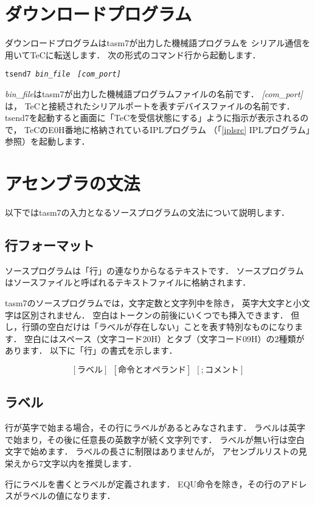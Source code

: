\section{ダウンロードプログラム}
ダウンロードプログラムはtasm7が出力した機械語プログラムを
シリアル通信を用いてTeCに転送します．
次の形式のコマンド行から起動します．

\begin{center}
{\small\tt tsend7  {\it bin\_file}　{\it [com\_port]}} \\
\end{center}

{\it bin\_file}はtasm7が出力した機械語プログラムファイルの名前です．
{\it [com\_port]}は，
TeCと接続されたシリアルポートを表すデバイスファイルの名前です．
tsend7を起動すると画面に「TeCを受信状態にする」ように指示が表示されるので，
TeCのE0H番地に格納されているIPLプログラム
（「\ref{iplsrc} IPLプログラム」参照）を起動します．

\section{アセンブラの文法}
\label{syn}
以下ではtasm7の入力となるソースプログラムの文法について説明します．

\subsection{行フォーマット}
ソースプログラムは「行」の連なりからなるテキストです．
ソースプログラムはソースファイルと呼ばれるテキストファイルに格納されます．

tasm7のソースプログラムでは，文字定数と文字列中を除き，
英字大文字と小文字は区別されません．
空白はトークンの前後にいくつでも挿入できます．
但し，行頭の空白だけは「ラベルが存在しない」ことを表す特別なものになります．
空白にはスペース（文字コード20H）とタブ（文字コード09H）の2種類があります．
以下に「行」の書式を示します．

{\small\[ [ラベル]~~[命令とオペランド]~~[ ; コメント] \]}

\subsection{ラベル}
行が英字で始まる場合，その行にラベルがあるとみなされます．
ラベルは英字で始まり，その後に任意長の英数字が続く文字列です．
ラベルが無い行は空白文字で始めます．
ラベルの長さに制限はありませんが，
アセンブルリストの見栄えから7文字以内を推奨します．

行にラベルを書くとラベルが定義されます．
EQU命令を除き，その行のアドレスがラベルの値になります．

